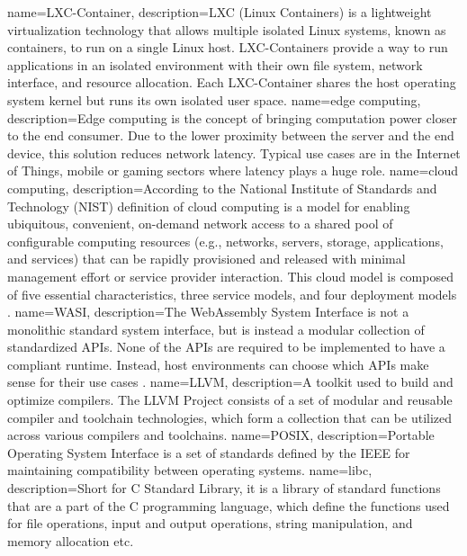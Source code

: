 {
    name=LXC-Container,
    description={LXC (Linux Containers) is a lightweight virtualization technology that allows multiple isolated Linux systems, known as containers, to run on a single Linux host. LXC-Containers provide a way to run applications in an isolated environment with their own file system, network interface, and resource allocation. Each LXC-Container shares the host operating system kernel but runs its own isolated user space.}
}
{
    name=edge computing,
    description={Edge computing is the concept of bringing computation power closer to the end consumer. Due to the lower proximity between the server and the end device, this solution reduces network latency. Typical use cases are in the Internet of Things, mobile or gaming sectors where latency plays a huge role.}
}
{
    name=cloud computing,
    description={According to the National Institute of Standards and Technology (NIST) definition of cloud computing is a model for enabling ubiquitous, convenient, on-demand network access to a shared pool of configurable computing resources (e.g., networks, servers, storage, applications, and services) that can be rapidly provisioned and released with minimal management effort or service provider interaction. This cloud model is composed of five essential characteristics, three service models, and four deployment models \cite{mell_2011_the}.}
}
{
    name=WASI,
    description={The WebAssembly System Interface is not a monolithic standard system interface, but is instead a modular collection of standardized APIs. None of the APIs are required to be implemented to have a compliant runtime. Instead, host environments can choose which APIs make sense for their use cases \cite{webassembly_2023_webassemblywasi}.}
}
{
    name=LLVM,
    description={A toolkit used to build and optimize compilers. The LLVM Project consists of a set of modular and reusable compiler and toolchain technologies, which form a collection that can be utilized across various compilers and toolchains.}
}
{
    name=POSIX,
    description={Portable Operating System Interface is a set of standards defined by the IEEE for maintaining compatibility between operating systems.}
}
{
    name=libc,
    description={Short for C Standard Library, it is a library of standard functions that are a part of the C programming language, which define the functions used for file operations, input and output operations, string manipulation, and memory allocation etc.}
}
